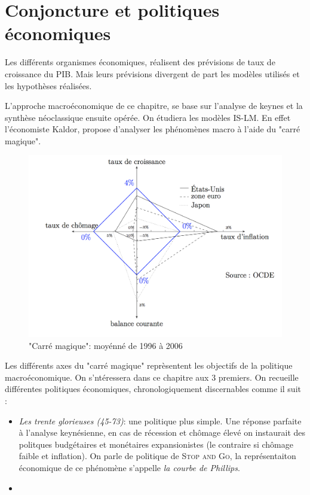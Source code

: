 \part{Conjoncture et politiques économiques} %
\label{prt:conjoncture_et_politiques_economiques}

Les différents organismes économiques, réalisent des prévisions de taux de croissance du PIB. Mais leurs prévisions divergent de part les modèles utilisés et 
les hypothèses réalisées.

L'approche macroéconomique de ce chapitre, se base sur l'analyse de keynes et la synthèse néoclassique ensuite opérée. On étudiera les modèles IS-LM. En effet 
l'économiste Kaldor, propose d'analyser les phénomènes macro à l'aide du "carré magique".

\begin{figure}[h]
	\begin{center}
		\includegraphics[scale=0.5]{./img/im2}
		\caption{"Carré magique": moyénné de 1996 à 2006}
	\end{center}
\end{figure}

Les différents axes du "carré magique" reprèsentent les objectifs de la politique macroéconomique. On s'ntéressera dans ce chapitre aux 3 premiers. On recueille
différentes politiques économiques, chronologiquement discernables comme il suit : 
\begin{itemize}[label=]
	\item \emph{Les trente glorieuses (45-73)}: une politique plus simple. Une réponse parfaite à l'analyse keynésienne, en cas de récession et chômage élevé
	on instaurait des politques budgétaires et monétaires expansionistes (le contraire si chômage faible et inflation). On parle de politique de \textsc{Stop and Go}, la représentaiton économique de ce phénomène s'appelle \emph{la courbe de Phillips}.
	\item 
\end{itemize}

